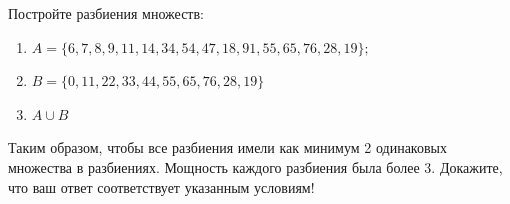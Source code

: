 \question
Постройте разбиения множеств:
\begin{enumerate}
	\renewcommand{\labelenumi}{\alph{enumi})}
	\item $A = \{6, 7, 8, 9, 11, 14, 34, 54, 47, 18, 91, 55, 65, 76, 28, 19\};$
	\item $B = \{0, 11, 22, 33, 44, 55, 65, 76, 28, 19\}$
	\item $A \cup B$
\end{enumerate}
Таким образом, чтобы все разбиения имели как минимум 2 одинаковых множества в разбиениях.
Мощность каждого разбиения была более 3.
Докажите, что ваш ответ соответствует указанным условиям!
